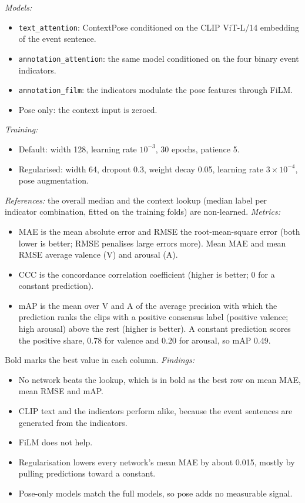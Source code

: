 \documentclass[11pt]{article}
\newcommand{\code}[1]{\texttt{#1}}
\begin{document}
\begin{table}[!htbp]
{\begin{itemize}
\end{itemize}
\emph{Models:}
\begin{itemize}
  \item \code{text\_attention}: ContextPose conditioned on the CLIP ViT-L/14 embedding of the event sentence.
  \item \code{annotation\_attention}: the same model conditioned on the four binary event indicators.
  \item \code{annotation\_film}: the indicators modulate the pose features through FiLM.
  \item Pose only: the context input is zeroed.
\end{itemize}
\emph{Training:}
\begin{itemize}
  \item Default: width 128, learning rate $10^{-3}$, 30 epochs, patience 5.
  \item Regularised: width 64, dropout 0.3, weight decay 0.05, learning rate $3\times10^{-4}$, pose augmentation.
\end{itemize}
\emph{References:} the overall median and the context lookup (median label per indicator combination, fitted on the training folds) are non-learned.
\emph{Metrics:}
\begin{itemize}
  \item MAE is the mean absolute error and RMSE the root-mean-square error (both lower is better; RMSE penalises large errors more). Mean MAE and mean RMSE average valence (V) and arousal (A).
  \item CCC is the concordance correlation coefficient (higher is better; 0 for a constant prediction).
  \item mAP is the mean over V and A of the average precision with which the prediction ranks the clips with a positive consensus label (positive valence; high arousal) above the rest (higher is better). A constant prediction scores the positive share, 0.78 for valence and 0.20 for arousal, so mAP 0.49.
\end{itemize}
Bold marks the best value in each column.
\emph{Findings:}
\begin{itemize}
  \item No network beats the lookup, which is in bold as the best row on mean MAE, mean RMSE and mAP.
  \item CLIP text and the indicators perform alike, because the event sentences are generated from the indicators.
  \item FiLM does not help.
  \item Regularisation lowers every network's mean MAE by about 0.015, mostly by pulling predictions toward a constant.
  \item Pose-only models match the full models, so pose adds no measurable signal.
\end{itemize}}
\end{table}
\end{document}
